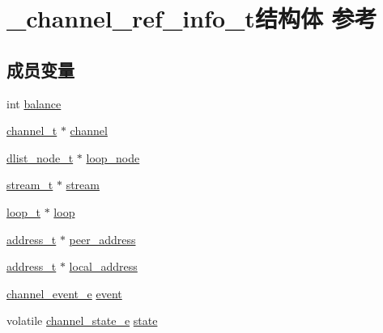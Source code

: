 \hypertarget{a00004}{}\section{\+\_\+channel\+\_\+ref\+\_\+info\+\_\+t结构体 参考}
\label{a00004}
\subsection*{成员变量}
\begin{DoxyCompactItemize}
\item 
int \hyperlink{a00004_a99bd34912f0ef9a5cdacd9df9c355ce5_a99bd34912f0ef9a5cdacd9df9c355ce5}{balance}
\item 
\hyperlink{a00047_a2effb3e20d0b7e5f6d5ac42118e0330b_a2effb3e20d0b7e5f6d5ac42118e0330b}{channel\+\_\+t} $\ast$ \hyperlink{a00004_a441b774dd529abf1712e5e69287658ba_a441b774dd529abf1712e5e69287658ba}{channel}
\item 
\hyperlink{a00047_a62053232bcf3566010ef98a7d77c3cc8_a62053232bcf3566010ef98a7d77c3cc8}{dlist\+\_\+node\+\_\+t} $\ast$ \hyperlink{a00004_a70fa475c90dda9133dfaa9fdcb79e958_a70fa475c90dda9133dfaa9fdcb79e958}{loop\+\_\+node}
\item 
\hyperlink{a00047_a261dba04f46f5c59a68a05f69f5a65a8_a261dba04f46f5c59a68a05f69f5a65a8}{stream\+\_\+t} $\ast$ \hyperlink{a00004_a27701935d3cd7358a0b92b3495afce7f_a27701935d3cd7358a0b92b3495afce7f}{stream}
\item 
\hyperlink{a00047_a9c3ad1cd2de83e09f3a7b59fa82c94ee_a9c3ad1cd2de83e09f3a7b59fa82c94ee}{loop\+\_\+t} $\ast$ \hyperlink{a00004_a6f756b85f16f61be42aa47e79ed836a9_a6f756b85f16f61be42aa47e79ed836a9}{loop}
\item 
\hyperlink{a00047_a7a6e75b85c8b441f843bd40004a7d9d5_a7a6e75b85c8b441f843bd40004a7d9d5}{address\+\_\+t} $\ast$ \hyperlink{a00004_ab97c60bda3feaabb2e1329318a7e1898_ab97c60bda3feaabb2e1329318a7e1898}{peer\+\_\+address}
\item 
\hyperlink{a00047_a7a6e75b85c8b441f843bd40004a7d9d5_a7a6e75b85c8b441f843bd40004a7d9d5}{address\+\_\+t} $\ast$ \hyperlink{a00004_a250e85c925e44e72600c9d662c0d328d_a250e85c925e44e72600c9d662c0d328d}{local\+\_\+address}
\item 
\hyperlink{a00047_a5ad43ab162fdf9ad53cde10ed3d87d99_a5ad43ab162fdf9ad53cde10ed3d87d99}{channel\+\_\+event\+\_\+e} \hyperlink{a00004_a61224f966c4df759a33ba36b43556b1c_a61224f966c4df759a33ba36b43556b1c}{event}
\item 
volatile \hyperlink{a00047_a1956eea3012f780b5d592a9d09d9873c_a1956eea3012f780b5d592a9d09d9873c}{channel\+\_\+state\+\_\+e} \hyperlink{a00004_ae42dcee90ddf852cdbd17ed254973f04_ae42dcee90ddf852cdbd17ed254973f04}{state}

\end{DoxyCompactItemize}
